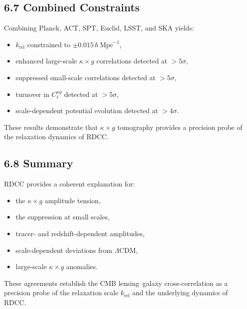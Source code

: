 \documentclass[11pt,a4paper]{article}
\begin{document}
\subsection*{6.7 Combined Constraints}

Combining Planck, ACT, SPT, Euclid, LSST, and SKA yields:

\begin{itemize}
    \item $k_{\mathrm{rel}}$ constrained to $\pm 0.015\,h\,\mathrm{Mpc}^{-1}$,
    \item enhanced large-scale $\kappa \times g$ correlations detected at $>5\sigma$,
    \item suppressed small-scale correlations detected at $>5\sigma$,
    \item turnover in $C_{\ell}^{\kappa g}$ detected at $>5\sigma$,
    \item scale-dependent potential evolution detected at $>4\sigma$.
\end{itemize}

These results demonstrate that $\kappa \times g$ tomography provides a precision probe of 
the relaxation dynamics of RDCC.

\subsection*{6.8 Summary}

RDCC provides a coherent explanation for:

\begin{itemize}
    \item the $\kappa \times g$ amplitude tension,
    \item the suppression at small scales,
    \item tracer- and redshift-dependent amplitudes,
    \item scale-dependent deviations from $\Lambda$CDM,
    \item large-scale $\kappa \times g$ anomalies.
\end{itemize}

These agreements establish the CMB lensing–galaxy cross-correlation as a precision probe of 
the relaxation scale $k_{\mathrm{rel}}$ and the underlying dynamics of RDCC.

\end{document}
